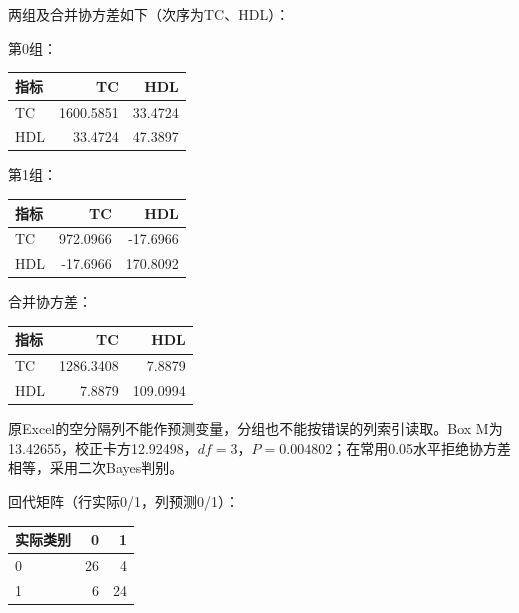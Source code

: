 
两组及合并协方差如下（次序为TC、HDL）：

第0组：

\begin{center}\small\setlength{\tabcolsep}{4pt}\renewcommand{\arraystretch}{1.18}\begin{tabular}{@{}lrr@{}}
\toprule
指标 & TC & HDL \\
\midrule

TC & 1600.5851 & 33.4724 \\
HDL & 33.4724 & 47.3897 \\
\bottomrule\end{tabular}\end{center}

第1组：

\begin{center}\small\setlength{\tabcolsep}{4pt}\renewcommand{\arraystretch}{1.18}\begin{tabular}{@{}lrr@{}}
\toprule
指标 & TC & HDL \\
\midrule

TC & 972.0966 & -17.6966 \\
HDL & -17.6966 & 170.8092 \\
\bottomrule\end{tabular}\end{center}

合并协方差：

\begin{center}\small\setlength{\tabcolsep}{4pt}\renewcommand{\arraystretch}{1.18}\begin{tabular}{@{}lrr@{}}
\toprule
指标 & TC & HDL \\
\midrule

TC & 1286.3408 & 7.8879 \\
HDL & 7.8879 & 109.0994 \\
\bottomrule\end{tabular}\end{center}

原Excel的空分隔列不能作预测变量，分组也不能按错误的列索引读取。Box M为13.42655，校正卡方12.92498，\(df=3\)，\(P=0.004802\)；在常用0.05水平拒绝协方差相等，采用二次Bayes判别。

回代矩阵（行实际0/1，列预测0/1）：

\begin{center}\small\setlength{\tabcolsep}{4pt}\renewcommand{\arraystretch}{1.18}\begin{tabular}{@{}lrr@{}}
\toprule
实际类别 & 0 & 1 \\
\midrule

0 & 26 & 4 \\
1 & 6 & 24 \\
\bottomrule\end{tabular}\end{center}


